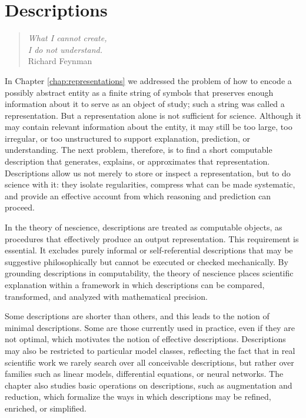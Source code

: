 %
%


\chapter{Descriptions}
\label{chap:Descriptions}

\begin{quote}
\begin{flushright}
\emph{What I cannot create, \\
I do not understand.} \\
Richard Feynman
\end{flushright}
\end{quote}
\bigskip

%
%

In Chapter \ref{chap:representations} we addressed the problem of how to encode a possibly abstract entity as a finite string of symbols that preserves enough information about it to serve as an object of study; such a string was called a representation. But a representation alone is not sufficient for science. Although it may contain relevant information about the entity, it may still be too large, too irregular, or too unstructured to support explanation, prediction, or understanding. The next problem, therefore, is to find a short computable description that generates, explains, or approximates that representation. Descriptions allow us not merely to store or inspect a representation, but to do science with it: they isolate regularities, compress what can be made systematic, and provide an effective account from which reasoning and prediction can proceed.

In the theory of nescience, descriptions are treated as computable objects, as procedures that effectively produce an output representation. This requirement is essential. It excludes purely informal or self-referential descriptions that may be suggestive philosophically but cannot be executed or checked mechanically. By grounding descriptions in computability, the theory of nescience places scientific explanation within a framework in which descriptions can be compared, transformed, and analyzed with mathematical precision.

Some descriptions are shorter than others, and this leads to the notion of minimal descriptions. Some are those currently used in practice, even if they are not optimal, which motivates the notion of effective descriptions. Descriptions may also be restricted to particular model classes, reflecting the fact that in real scientific work we rarely search over all conceivable descriptions, but rather over families such as linear models, differential equations, or neural networks. The chapter also studies basic operations on descriptions, such as augmentation and reduction, which formalize the ways in which descriptions may be refined, enriched, or simplified.

